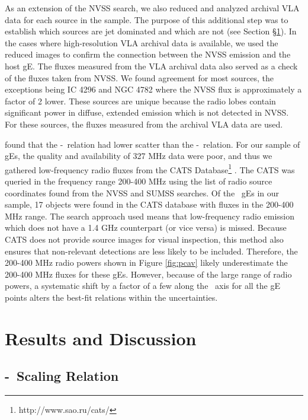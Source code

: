 \documentclass{emulateapj}
\begin{document}
As an extension of the NVSS search, we also reduced and analyzed
archival VLA data for each source in the sample. The purpose of this
additional step was to establish which sources are jet dominated and
which are not (see Section \S\ref{sec:r&d}). In the cases where
high-resolution VLA archival data is available, we used the reduced
images to confirm the connection between the NVSS emission and the
host gE. The fluxes measured from the VLA archival data also served as
a check of the fluxes taken from NVSS. We found agreement for most
sources, the exceptions being IC 4296 and NGC 4782 where the NVSS flux
is approximately a factor of 2 lower. These sources are unique because
the radio lobes contain significant power in diffuse, extended
emission which is not detected in NVSS. For these sources, the fluxes
measured from the archival VLA data are used.

\citet{birzan08} found that the \pcav-\pthree\ relation had lower
scatter than the \pcav-\phigh\ relation. For our sample of gEs, the
quality and availability of 327 MHz data were poor, and thus we
gathered low-frequency radio fluxes from the CATS
Database\footnote{http://www.sao.ru/cats/} \citep{cats}. The CATS was
queried in the frequency range 200-400 MHz using the list of radio
source coordinates found from the NVSS and SUMSS searches. Of the
\samp\ gEs in our sample, 17 objects were found in the CATS database
with fluxes in the 200-400 MHz range. The search approach used means
that low-frequency radio emission which does not have a 1.4 GHz
counterpart (or vice versa) is missed. Because CATS does not provide
source images for visual inspection, this method also ensures that
non-relevant detections are less likely to be included. Therefore, the
200-400 MHz radio powers shown in Figure \ref{fig:pcav} likely
underestimate the 200-400 MHz fluxes for these gEs. However, because
of the large range of radio powers, a systematic shift by a factor of
a few along the \radpow\ axis for all the gE points alters the
best-fit relations within the uncertainties.

\section{Results and Discussion}
\label{sec:r&d}

\subsection{\pjet-\prad\ Scaling Relation}
\label{sec:relation}
\end{document}
